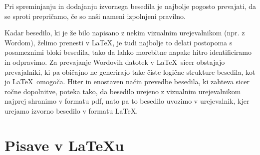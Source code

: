 \documentclass[a4paper, 12pt]{book}
\begin{document}
Pri spreminjanju in dodajanju izvornega besedila je najbolje pogosto prevajati, da se sproti prepričamo, če so naši nameni izpolnjeni pravilno.

Kadar besedilo, ki je že bilo napisano z nekim vizualnim urejevalnikom (npr. z Wordom), želimo prenesti v \LaTeX, je tudi najbolje to delati postopoma s posameznimi bloki besedila, 
tako da lahko morebitne napake hitro identificiramo in odpravimo.
Za prevajanje Wordovih datotek v \LaTeX\ sicer obstajajo prevajalniki, ki pa običajno ne generirajo take čiste logične strukture besedila, kot jo  \LaTeX\ omogoča.
Hiter in enostaven način prevedbe besedila, ki  zahteva sicer ročne dopolnitve, poteka tako, da besedilo urejeno z vizualnim urejevalnikom najprej shranimo v formatu pdf, 
nato pa to besedilo uvozimo v urejevalnik, kjer urejamo izvorno besedilo v formatu \LaTeX.


\section{Pisave v \LaTeX u}
\end{document}
